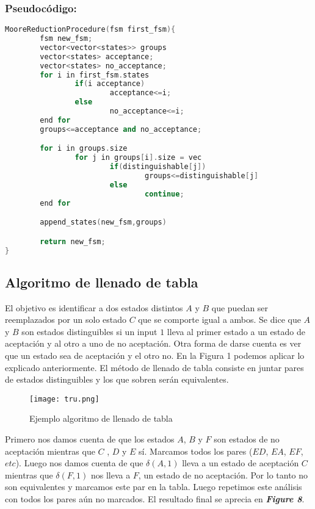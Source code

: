 \documentclass[12pt]{article}
\begin{document}
\subsubsection{Pseudoc\'odigo:}
\begin{lstlisting}[language=c++]
MooreReductionProcedure(fsm first_fsm){
        fsm new_fsm;
        vector<vector<states>> groups
        vector<states> acceptance;
        vector<states> no_acceptance;
        for i in first_fsm.states
                if(i acceptance)
                        acceptance<=i;
                else
                        no_acceptance<=i;
        end for
        groups<=acceptance and no_acceptance;

        for i in groups.size
                for j in groups[i].size = vec
                        if(distinguishable[j])
                                groups<=distinguishable[j]
                        else
                                continue;
        end for

        append_states(new_fsm,groups)

        return new_fsm;
}

\end{lstlisting}


\subsection{Algoritmo de llenado de tabla}

	El objetivo es identificar a dos estados distintos $A$ y $B$ que puedan ser reemplazados por un solo estado $C$ que se comporte igual a ambos. Se dice que $A$ y $B$ son estados distinguibles si un input $1$ lleva al primer estado a un estado de aceptación y al otro a uno de no aceptación. Otra forma de darse cuenta es ver que un estado sea de aceptación y el otro no.	En la Figura 1 podemos aplicar lo explicado anteriormente. El método de llenado de tabla consiste en juntar pares de estados distinguibles y los que sobren serán equivalentes.


\begin{figure}[h]
    \centering
    \texttt{[image: tru.png]}
    \caption{Ejemplo algoritmo de llenado de tabla}
    \label{fig:my_label}
\end{figure}

Primero nos damos cuenta de que los estados $A$, $B$ y $F$ son estados de no aceptación mientras que $C$ , $D$ y $E$ sí. Marcamos todos los pares ($ED$, $EA$, $EF$, $etc$). Luego nos damos cuenta de que $δ(A,1)$ lleva a un estado de aceptación $C$ mientras que $δ(F,1)$ nos lleva a $F$, un estado de no aceptación. Por lo tanto no son equivalentes y marcamos este par en la tabla. Luego repetimos este análisis con todos los pares aún no marcados. El resultado final se aprecia  en \textbf{\textit{Figure 8}}.
\end{document}
